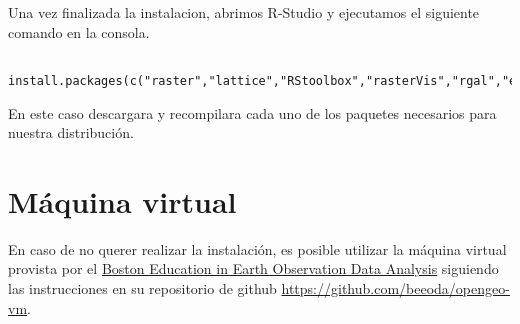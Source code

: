 Una vez finalizada la instalacion, abrimos R-Studio y ejecutamos el siguiente comando en la consola.

\begin{lstlisting}
  install.packages(c("raster","lattice","RStoolbox","rasterVis","rgal","e1071","randomForest","kernlab"))
\end{lstlisting}

En este caso descargara y recompilara cada uno de los paquetes necesarios para nuestra distribuci\'on.

\section{M\'aquina virtual}

En caso de no querer realizar la instalaci\'on, es posible utilizar la m\'aquina virtual provista por el \href{www.beeoda.org}{Boston Education in Earth Observation Data Analysis} siguiendo las instrucciones en su repositorio de github \url{https://github.com/beeoda/opengeo-vm}.
